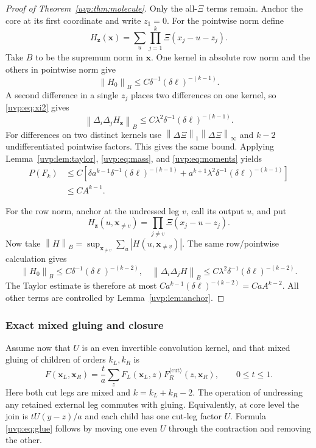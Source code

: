 \documentclass[11pt]{article}
\numberwithin{equation}{section}
\theoremstyle{remark}
\newcommand{\norm}[1]{\left\|#1\right\|}
\begin{document}
\begin{proof}[Proof of Theorem~\ref{uvp:thm:molecule}]
Only the all-$\Xi$ terms remain. Anchor the core at its first
coordinate and write $z_1=0$. For the pointwise norm define
\[
 H_{\boldsymbol z}(\boldsymbol x)=
       \sum_u\prod_{j=1}^k\Xi(x_j-u-z_j).
\]
Take $B$ to be the supremum norm in $\boldsymbol x$.
One kernel in absolute row norm and the others in pointwise norm give
\[
 \norm{H_0}_B\le C\delta^{-1}(\delta\ell)^{-(k-1)}.
\]
A second difference in a single $z_j$ places two differences on one
kernel, so \eqref{uvp:eq:xi2} gives
\[
 \norm{\Delta_i\Delta_j H_{\boldsymbol z}}_B
 \le C\lambda^2\delta^{-1}(\delta\ell)^{-(k-1)}.
\]
For differences on two distinct kernels use
$\norm{\Delta\Xi}_1\norm{\Delta\Xi}_\infty$
and $k-2$ undifferentiated pointwise factors. This gives the same bound.
Applying Lemma~\ref{uvp:lem:taylor}, \eqref{uvp:eq:mass}, and
\eqref{uvp:eq:moments} yields
\begin{align*}
 P(F_k)&\le C\left[
  \delta a^{k-1}\delta^{-1}(\delta\ell)^{-(k-1)}
  +a^{k+1}\lambda^2\delta^{-1}(\delta\ell)^{-(k-1)}\right]\\
 &\le C A^{k-1}.
\end{align*}

For the row norm, anchor at the undressed leg $v$, call its output
$u$, and put
\[
 H_{\boldsymbol z}(u,\boldsymbol x_{\ne v})
       =\prod_{j\ne v}\Xi(x_j-u-z_j).
\]
Now take $\norm H_B=\sup_{\boldsymbol x_{\ne v}}\sum_u|H(u,\boldsymbol
x_{\ne v})|$. The same row/pointwise calculation gives
\[
 \norm{H_0}_B\le C\delta^{-1}(\delta\ell)^{-(k-2)},\quad
 \norm{\Delta_i\Delta_jH}_B
   \le C\lambda^2\delta^{-1}(\delta\ell)^{-(k-2)}.
\]
The Taylor estimate is therefore at most
$Ca^{k-1}(\delta\ell)^{-(k-2)}=CaA^{k-2}$.
All other terms are controlled by Lemma~\ref{uvp:lem:anchor}.
\end{proof}

\subsubsection{Exact mixed gluing and closure}
Assume now that $U$ is an even invertible convolution kernel, and that
mixed gluing of children of orders $k_L,k_R$ is
\begin{equation}\label{uvp:eq:glue}
 F(\boldsymbol x_L,\boldsymbol x_R)
  =\frac{t}{a}\sum_z F_L(\boldsymbol x_L,z)
                F_R^{\langle\mathrm{cut}\rangle}(z,\boldsymbol x_R),
 \qquad 0\le t\le1.
\end{equation}
Here both cut legs are mixed and $k=k_L+k_R-2$.
The operation of undressing any retained external leg commutes with
gluing. Equivalently, at core level the join is $tU(y-z)/a$ and each
child has one cut-leg factor $U$. Formula \eqref{uvp:eq:glue} follows
by moving one even $U$ through the contraction and removing the other.
\end{document}
